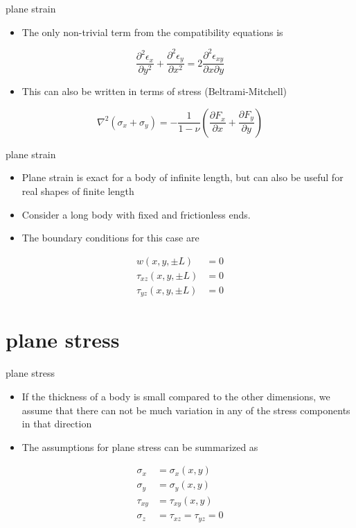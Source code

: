 \documentclass[
  letterpaper,
  ignorenonframetext,
  aspectratio=43,
  handout,
  12pt]{beamer}
\providecommand{\tightlist}{%
  \setlength{\itemsep}{0pt}\setlength{\parskip}{0pt}}
\providecommand{\tightlist}{%
\setlength{\itemsep}{0pt}\setlength{\parskip}{0pt}}
\begin{document}
\begin{frame}{plane strain}
\protect\hypertarget{plane-strain-7}{}
\begin{itemize}
\tightlist
\item
  The only non-trivial term from the compatibility equations is
\end{itemize}

\[\frac{\partial^2 \epsilon_x}{\partial y^2} + \frac{\partial^2 \epsilon_y}{\partial x^2} = 2\frac{\partial^2 \epsilon_{xy}}{\partial x \partial y}\]

\begin{itemize}
\tightlist
\item
  This can also be written in terms of stress (Beltrami-Mitchell)
\end{itemize}

\[\nabla^2(\sigma_x + \sigma_y) = -\frac{1}{1-\nu}\left(\frac{\partial F_x}{\partial x} + \frac{\partial F_y}{\partial y}\right)\]
\end{frame}

\begin{frame}{plane strain}
\protect\hypertarget{plane-strain-8}{}
\begin{itemize}
\tightlist
\item
  Plane strain is exact for a body of infinite length, but can also be
  useful for real shapes of finite length
\item
  Consider a long body with fixed and frictionless ends.
\item
  The boundary conditions for this case are
\end{itemize}

\[\begin{aligned}
    w(x,y,\pm L) &= 0\\
    \tau_{xz}(x,y,\pm L) &= 0\\
    \tau_{yz}(x,y,\pm L) &= 0
\end{aligned}\]
\end{frame}

\hypertarget{plane-stress}{%
\section{plane stress}\label{plane-stress}}

\begin{frame}{plane stress}
\protect\hypertarget{plane-stress-1}{}
\begin{itemize}
\tightlist
\item
  If the thickness of a body is small compared to the other dimensions,
  we assume that there can not be much variation in any of the stress
  components in that direction
\item
  The assumptions for plane stress can be summarized as
\end{itemize}

\[\begin{aligned}
    \sigma_x &= \sigma_x(x,y)\\
    \sigma_y &= \sigma_y(x,y)\\
    \tau_{xy} &= \tau_{xy}(x,y)\\
    \sigma_z &= \tau_{xz} = \tau_{yz} = 0
\end{aligned}\]
\end{frame}
\end{document}
